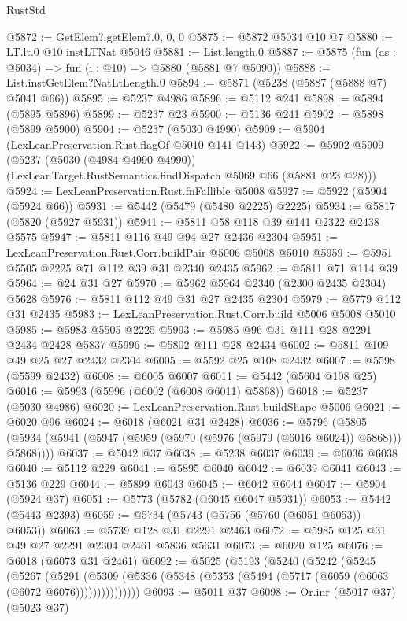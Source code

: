 \begin{lexlean}{RustStd}
\begin{coremodule}
{\begin{coremodule}
{{{{{{{{{{{{@5872 := GetElem?.getElem?.{0, 0, 0}
@5875 := @5872 @5034 @10 @7
@5880 := LT.lt.{0} @10 instLTNat @5046
@5881 := List.length.{0}
@5887 := @5875 (fun (as : @5034) => fun (i : @10) => @5880 (@5881 @7 @5090))
@5888 := List.instGetElem?NatLtLength.{0}
@5894 := @5871 (@5238 (@5887 (@5888 @7) @5041 @66))
@5895 := @5237 @4986
@5896 := @5112 @241
@5898 := @5894 (@5895 @5896)
@5899 := @5237 @23
@5900 := @5136 @241
@5902 := @5898 (@5899 @5900)
@5904 := @5237 (@5030 @4990)
@5909 := @5904 (LexLeanPreservation.Rust.flagOf @5010 @141 @143)
@5922 := @5902
    @5909
    (@5237
      (@5030 (@4984 @4990 @4990))
      (LexLeanTarget.RustSemantics.findDispatch @5069 @66 (@5881 @23 @28)))
@5924 := LexLeanPreservation.Rust.fnFallible @5008
@5927 := @5922 (@5904 (@5924 @66))
@5931 := @5442 (@5479 (@5480 @2225) @2225)
@5934 := @5817 (@5820 (@5927 @5931))
@5941 := @5811 @58 @118 @39 @141 @2322 @2438 @5575
@5947 := @5811 @116 @49 @94 @27 @2436 @2304
@5951 := LexLeanPreservation.Rust.Corr.buildPair @5006 @5008 @5010
@5959 := @5951 @5505 @2225 @71 @112 @39 @31 @2340 @2435
@5962 := @5811 @71 @114 @39
@5964 := @24 @31 @27
@5970 := @5962 @5964 @2340 (@2300 @2435 @2304) @5628
@5976 := @5811 @112 @49 @31 @27 @2435 @2304
@5979 := @5779 @112 @31 @2435
@5983 := LexLeanPreservation.Rust.Corr.build @5006 @5008 @5010
@5985 := @5983 @5505 @2225
@5993 := @5985 @96 @31 @111 @28 @2291 @2434 @2428 @5837
@5996 := @5802 @111 @28 @2434
@6002 := @5811 @109 @49 @25 @27 @2432 @2304
@6005 := @5592 @25 @108 @2432
@6007 := @5598 (@5599 @2432)
@6008 := @6005 @6007
@6011 := @5442 (@5604 @108 @25)
@6016 := @5993 (@5996 (@6002 (@6008 @6011) @5868))
@6018 := @5237 (@5030 @4986)
@6020 := LexLeanPreservation.Rust.buildShape @5006
@6021 := @6020 @96
@6024 := @6018 (@6021 @31 @2428)
@6036 := @5796
    (@5805 (@5934 (@5941 (@5947 (@5959 (@5970 (@5976 (@5979 (@6016 @6024)) @5868))) @5868))))
@6037 := @5042 @37
@6038 := @5238 @6037
@6039 := @6036 @6038
@6040 := @5112 @229
@6041 := @5895 @6040
@6042 := @6039 @6041
@6043 := @5136 @229
@6044 := @5899 @6043
@6045 := @6042 @6044
@6047 := @5904 (@5924 @37)
@6051 := @5773 (@5782 (@6045 @6047 @5931))
@6053 := @5442 (@5443 @2393)
@6059 := @5734 (@5743 (@5756 (@5760 (@6051 @6053)) @6053))
@6063 := @5739 @128 @31 @2291 @2463
@6072 := @5985 @125 @31 @49 @27 @2291 @2304 @2461 @5836 @5631
@6073 := @6020 @125
@6076 := @6018 (@6073 @31 @2461)
@6092 := @5025
    (@5193
      (@5240
        (@5242
          (@5245
            (@5267
              (@5291
                (@5309 (@5336 (@5348 (@5353 (@5494 (@5717 (@6059 (@6063 (@6072 @6076)))))))))))))))
@6093 := @5011 @37
@6098 := Or.inr (@5017 @37) (@5023 @37)
}}}}}}}}}}}}
\end{coremodule}}
\end{coremodule}
\end{lexlean}
